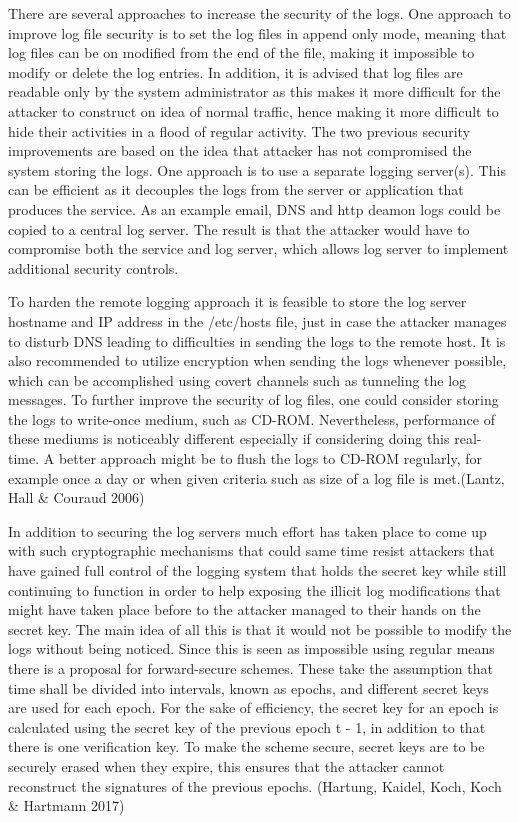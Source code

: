 \documentclass{article}
\begin{document}
There are several approaches to increase the security of the logs. One approach to improve log file security is to set the log files in append only mode, meaning that log files can be on modified from the end of the file, making it impossible to modify or delete the log entries. In addition, it is advised that log files are readable only by the system administrator as this makes it more difficult for the attacker to construct on idea of normal traffic, hence making it more difficult to hide their activities in a flood of regular activity. The two previous security improvements are based on the idea that attacker has not compromised the system storing the logs.  One approach is to use a separate logging server(s). This can be efficient as it decouples the logs from the server or application that produces the service. As an example email, DNS and http deamon logs could be copied to a central log server. The result is that the attacker would have to compromise both the service and log server, which allows log server to implement additional security controls.
\par
To harden the remote logging approach it is feasible to store the log server hostname and IP address in the /etc/hosts file, just in case the attacker manages to disturb DNS leading to difficulties in sending the logs to the remote host. It is also recommended to utilize encryption when sending the logs whenever possible, which can be accomplished using covert channels such as tunneling the log messages. To further improve the security of log files, one could consider storing the logs to write-once medium, such as CD-ROM. Nevertheless, performance of these mediums is noticeably different especially if considering doing this real-time. A better approach might be to flush the logs to CD-ROM regularly, for example once a day or when given criteria such as size of a log file is met.(Lantz, Hall \& Couraud 2006)
\par
In addition to securing the log servers much effort has taken place to come up with such cryptographic mechanisms that could same time resist attackers that have gained full control of the logging system that holds the secret key while still continuing to function in order to help exposing the illicit log modifications that might have taken place before to the attacker managed to their hands on the secret key. The main idea of all this is that it would not be possible to modify the logs without being noticed. Since this is seen as impossible using regular means there is a proposal for forward-secure schemes. These take the assumption that time shall be divided into intervals, known as epochs, and different secret keys are used for each epoch. For the sake of efficiency, the secret key for an epoch is calculated using the secret key of the previous epoch t - 1, in addition to that there is one verification key. To make the scheme secure, secret keys are to be securely erased when they expire, this ensures that the attacker cannot reconstruct the signatures of the previous epochs. (Hartung, Kaidel, Koch, Koch \& Hartmann 2017)
\end{document}
